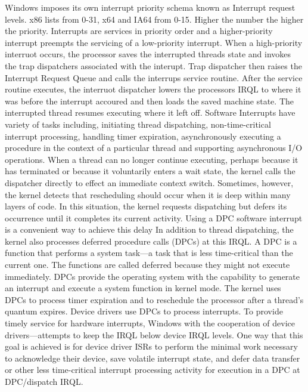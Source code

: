 \documentclass[letterpaper,10pt,draftclsnofoot,onecolumn]{IEEEtran}
\begin{document}
Windows imposes its own interrupt priority schema known as Interrupt request levels. x86 lists from 0-31, x64 and IA64 from 0-15. Higher the number the higher the priority. Interrupts are services in priority order and a higher-priority interrupt preempts the servicing of a low-priority interrupt. When a high-priority interruot occurs, the processor saves the interrupted threads state and invokes the trap dispatchers associated with the interupt. Trap dispatcher then raises the Interrupt Request Queue and calls the interrups service routine. After the service routine executes, the interruot dispatcher lowers the processors IRQL to where it was before the interrupt accoured and then loads the saved machine state. The interrupted thread resumes executing where it left off.
Software Interrupts have variety of tasks including, initiating thread dispatching, non-time-critical interrupt processing, handling timer expiration, asynchronously executing a procedure in the context of a particular thread and supporting asynchronous I/O operations.
When a thread can no longer continue executing, perhaps because it has terminated or because it voluntarily enters a wait state, the kernel calls the dispatcher directly to effect an immediate context switch. Sometimes, however, the kernel detects that rescheduling should occur when it is deep within many layers of code. In this situation, the kernel requests dispatching but defers its occurrence until it completes its current activity. Using a DPC software interrupt is a convenient way to achieve this delay
In addition to thread dispatching, the kernel also processes deferred procedure calls (DPCs) at this IRQL. A DPC is a function that performs a system task—a task that is less time-critical than the current one. The functions are called deferred because they might not execute immediately. DPCs provide the operating system with the capability to generate an interrupt and execute a system function in kernel mode. The kernel uses DPCs to process timer expiration and to reschedule the processor after a thread’s quantum expires. Device drivers use DPCs to process interrupts. To provide timely service for hardware interrupts, Windows with the cooperation of device drivers—attempts to keep the IRQL below device IRQL levels. One way that this goal is achieved is for device driver ISRs to perform the minimal work necessary to acknowledge their device, save volatile interrupt state, and defer data transfer or other less time-critical interrupt processing activity for execution in a DPC at DPC/dispatch IRQL.
\end{document}
